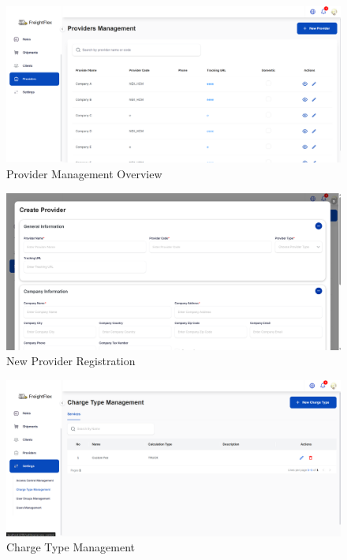 \begin{figure}[H]
    \centering
    \includegraphics[width=15cm]{graphics/UI/provider-management.png}
    \caption{Provider Management Overview}
    \label{fig:provider-management}
\end{figure}

\begin{figure}[H]
    \centering
    \includegraphics[width=15cm]{graphics/UI/new-provider.png}
    \caption{New Provider Registration}
    \label{fig:new-provider}
\end{figure}

\begin{figure}[H]
    \centering
    \includegraphics[width=15cm]{graphics/UI/charge-type-management.png}
    \caption{Charge Type Management}
    \label{fig:charge-type-management}
\end{figure}

